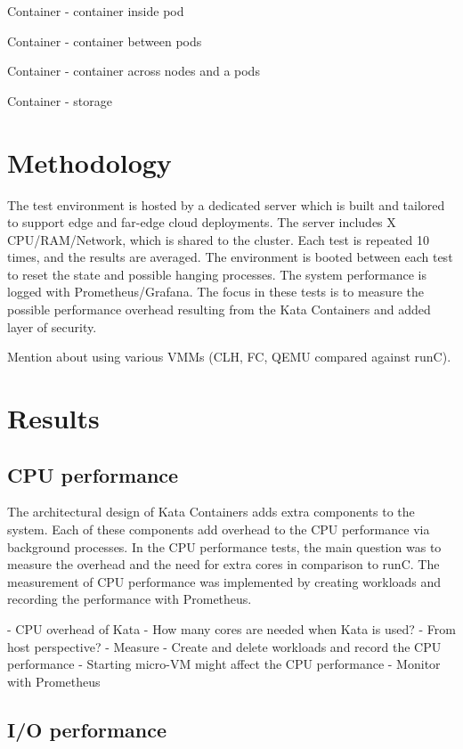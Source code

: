 Container - container inside pod

Container - container between pods

Container - container across nodes and a pods

Container - storage

\section{Methodology}

The test environment is hosted by a dedicated server which is built and tailored to support edge and far-edge cloud deployments. The server includes X CPU/RAM/Network, which is shared to the cluster. Each test is repeated 10 times, and the results are averaged. The environment is booted between each test to reset the state and possible hanging processes. The system performance is logged with Prometheus/Grafana. The focus in these tests is to measure the possible performance overhead resulting from the Kata Containers and added layer of security.

Mention about using various VMMs (CLH, FC, QEMU compared against runC).

\section{Results}

\subsection{CPU performance}

The architectural design of Kata Containers adds extra components to the system. Each of these components add overhead to the CPU performance via background processes. In the CPU performance tests, the main question was to measure the overhead and the need for extra cores in comparison to runC. The measurement of CPU performance was implemented by creating workloads and recording the performance with Prometheus. 

- CPU overhead of Kata
	- How many cores are needed when Kata is used?
	- From host perspective?
	- Measure
		- Create and delete workloads and record the CPU performance
			- Starting micro-VM might affect the CPU performance
			- Monitor with Prometheus

\subsection{I/O performance}

